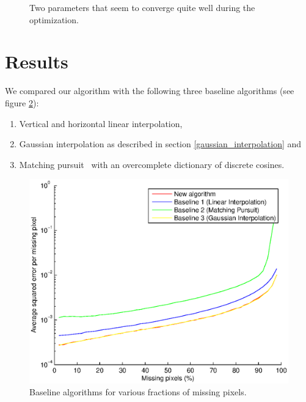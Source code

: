 \documentclass[10pt,conference,compsocconf]{IEEEtran}
\begin{document}
\begin{figure}
  \centering
  \caption{Two parameters that seem to converge quite well during the optimization.}
  \label{gradient_descent_parameters}
\end{figure}

\section{Results}
We compared our algorithm with the following three baseline algorithms (see figure \ref{baseline_algorithms}):
\begin{enumerate}
\item Vertical and horizontal linear interpolation,
\item Gaussian interpolation as described in section \ref{gaussian_interpolation} and
\item Matching pursuit~\cite{matchingpursuit93} with an overcomplete dictionary of discrete cosines.
\end{enumerate}

\begin{figure}
\centering
\includegraphics[width=\columnwidth]{images/missingpixelsVsError.eps}
\caption{Baseline algorithms for various fractions of missing pixels.}
\label{baseline_algorithms}
\end{figure}
 
\end{document}
